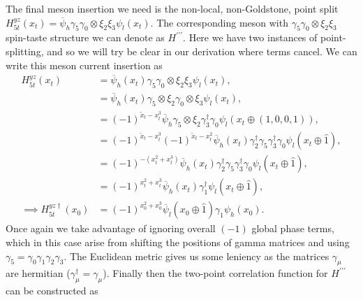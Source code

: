 The final meson insertion we need is the non-local, non-Goldstone, point split $H^{yz}_{5t}(x_t) = \overline{\psi}_h\gamma_5\gamma_0 \otimes \xi_2\xi_3 \psi_l(x_t)$.  The corresponding meson with $\gamma_5\gamma_0 \otimes \xi_2\xi_3$ spin-taste structure we can denote as $H^{\prime\prime\prime}$. Here we have two instances of point-splitting, and so we will try be clear in our derivation where terms cancel.  We can write this meson current insertion as
\begin{equation}\label{eq:tensor2ptoperator}
\begin{split}
    H^{yz}_{5t}(x_t) &= \overline{\psi}_h(x_t)\gamma_5\gamma_0 \otimes \xi_2\xi_3 \psi_l(x_t),\\
    &= \overline{\psi}_h(x_t)\gamma_5\otimes \xi_2\gamma_0 \otimes \xi_3 \psi_l(x_t),\\
    &= (-1)^{\tilde{x}_t-x^3_t}\overline{\psi}_h\gamma_5\otimes \xi_2 \gamma^\dagger_3\gamma_0\psi_l(x_t\oplus (1,0,0,1)),\\
     &= (-1)^{\tilde{x}_t-x^3_t}(-1)^{\tilde{x}_t-x^2_t}\overline{\psi}_h(x_t) \gamma^\dagger_2\gamma_5 \gamma^\dagger_3\gamma_0\psi_l(x_t\oplus \hat1),\\
     &= (-1)^{-(x^2_t+x^3_t)}\overline{\psi}_h(x_t) \gamma^\dagger_2\gamma_5 \gamma^\dagger_3\gamma_0\psi_l(x_t\oplus \hat1),\\
     &= (-1)^{x^2_t+x^3_t}\overline{\psi}_h (x_t)\gamma^\dagger_1\psi_l(x_t\oplus \hat1),\\
     \implies  H^{yz\dagger}_{5t}(x_0) &= (-1)^{x^2_0+x^3_0}\overline{\psi}_l(x_0\oplus \hat1) \gamma_1 \psi_h(x_0).
\end{split}
\end{equation}
Once again we take advantage of ignoring overall $(-1)$ global phase terms, which in this case arise from shifting the positions of gamma matrices and using $\gamma_5=\gamma_0\gamma_1\gamma_2\gamma_3$.  The Euclidean metric gives us some leniency as the matrices $\gamma_\mu$ are hermitian ($\gamma_\mu^\dagger =\gamma_\mu$).  Finally then the two-point correlation function for $H^{\prime\prime\prime}$ can be constructed as

